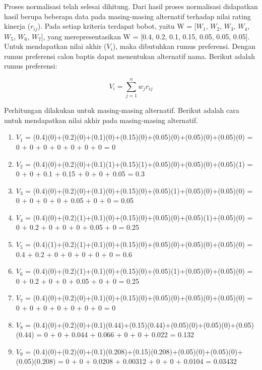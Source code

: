\documentclass[a4paper,twoside]{article}
\begin{document}
\begin{enumerate}
Proses normalisasi telah selesai dihitung. Dari hasil proses normalisasi didapatkan hasil berupa beberapa data pada masing-masing alternatif terhadap nilai rating kinerja ($r_{ij}$). Pada setiap kriteria terdapat bobot, yaitu W = [$W_{1}$, $W_{2}$, $W_{3}$, $W_{4}$, $W_{5}$, $W_{6}$, $W_{7}$], yang merepresentasikan W = [0.4, 0.2, 0.1, 0.15, 0.05, 0.05, 0.05]. Untuk mendapatkan nilai akhir ($V_{i}$), maka dibutuhkan rumus preferensi. Dengan rumus preferensi calon baptis dapat menentukan alternatif nama. Berikut adalah rumus preferensi:

\[
 V_{i} =\displaystyle\sum_{j=1}^{n} w_{j} r_{ij}
\]


Perhitungan dilakukan untuk masing-masing alternatif. Berikut adalah cara untuk mendapatkan nilai akhir pada masing-masing alternatif.

\begin{enumerate}
	\item $V_{1}$ = (0.4)(0)+(0.2)(0)+(0.1)(0)+(0.15)(0)+(0.05)(0)+(0.05)(0)+(0.05)(0) = 0 + 0 + 0 + 0 + 0 + 0 + 0 = 0
	
	\item $V_{2}$ = (0.4)(0)+(0.2)(0)+(0.1)(1)+(0.15)(1)+(0.05)(0)+(0.05)(0)+(0.05)(1) = 0 + 0 + 0.1 + 0.15 + 0 + 0 + 0.05 = 0.3
	
	\item $V_{3}$ = (0.4)(0)+(0.2)(0)+(0.1)(0)+(0.15)(0)+(0.05)(1)+(0.05)(0)+(0.05)(0) = 0 + 0 + 0 + 0 + 0.05 + 0 + 0 = 0.05
	
	\item $V_{4}$ = (0.4)(0)+(0.2)(1)+(0.1)(0)+(0.15)(0)+(0.05)(0)+(0.05)(1)+(0.05)(0) = 0 + 0.2 + 0 + 0 + 0 + 0.05 + 0 = 0.25
	
	\item $V_{5}$ = (0.4)(1)+(0.2)(1)+(0.1)(0)+(0.15)(0)+(0.05)(0)+(0.05)(0)+(0.05)(0) = 0.4 + 0.2 + 0 + 0 + 0 + 0 + 0 = 0.6
	
	\item $V_{6}$ = (0.4)(0)+(0.2)(1)+(0.1)(0)+(0.15)(0)+(0.05)(1)+(0.05)(0)+(0.05)(0) = 0 + 0.2 + 0 + 0 + 0.05 + 0 + 0 = 0.25
	
	\item $V_{7}$ = (0.4)(0)+(0.2)(0)+(0.1)(0)+(0.15)(0)+(0.05)(0)+(0.05)(0)+(0.05)(0) = 0 + 0 + 0 + 0 + 0 + 0 + 0 = 0
	
	\item $V_{8}$ = (0.4)(0)+(0.2)(0)+(0.1)(0.44)+(0.15)(0.44)+(0.05)(0)+(0.05)(0)+(0.05)(0.44) = 0 + 0 + 0.044 + 0.066 + 0 + 0 + 0.022 = 0.132
	
	\item $V_{9}$ = (0.4)(0)+(0.2)(0)+(0.1)(0.208)+(0.15)(0.208)+(0.05)(0)+(0.05)(0)+(0.05)(0.208) = 0 + 0 + 0.0208 + 0.00312 + 0 + 0 + 0.0104 = 0.03432
	

\end{enumerate}
\end{enumerate}
\end{document}
